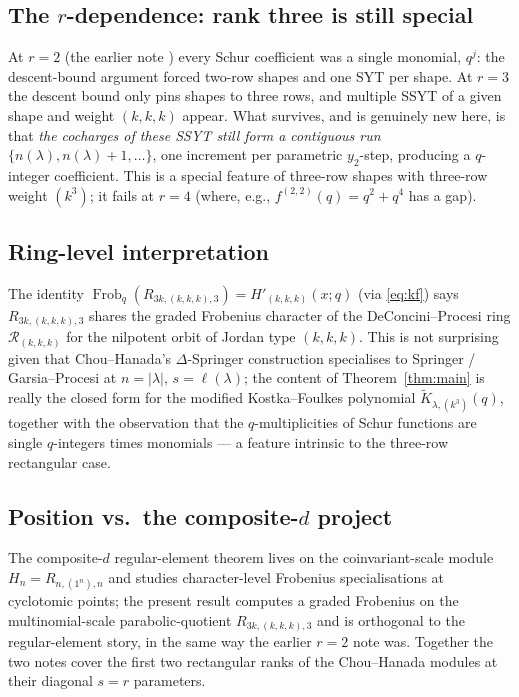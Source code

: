 \documentclass[11pt]{article}
\theoremstyle{definition}
\theoremstyle{remark}
\DeclareMathOperator{\Frob}{Frob}
\begin{document}
\subsection*{The $r$-dependence: rank three is still special}

At $r = 2$ (the earlier note \cite{clio-r2}) every Schur coefficient was a
single monomial, $q^j$: the descent-bound argument forced two-row shapes
and one SYT per shape. At $r = 3$ the descent bound only pins shapes to
three rows, and multiple SSYT of a given shape and weight $(k,k,k)$
appear. What survives, and is genuinely new here, is that
\emph{the cocharges of these SSYT still form a contiguous run}
$\{n(\lambda), n(\lambda)+1, \ldots\}$, one increment per parametric
$y_2$-step, producing a $q$-integer coefficient. This is a special feature
of three-row shapes with three-row weight $(k^3)$; it fails at $r = 4$
(where, e.g., $f^{(2,2)}(q) = q^2 + q^4$ has a gap).

\subsection*{Ring-level interpretation}

The identity $\Frob_q(R_{3k,(k,k,k),3}) = H'_{(k,k,k)}(x;q)$ (via
\eqref{eq:kf}) says $R_{3k,(k,k,k),3}$ shares the graded Frobenius
character of the DeConcini--Procesi ring $\mathcal R_{(k,k,k)}$ for the
nilpotent orbit of Jordan type $(k,k,k)$. This is not surprising given that
Chou--Hanada's $\Delta$-Springer construction specialises to Springer /
Garsia--Procesi at $n = |\lambda|,\, s = \ell(\lambda)$; the content of
Theorem~\ref{thm:main} is really the closed form for the modified
Kostka--Foulkes polynomial $\widetilde K_{\lambda,(k^3)}(q)$, together with
the observation that the $q$-multiplicities of Schur functions are single
$q$-integers times monomials --- a feature intrinsic to the three-row
rectangular case.

\subsection*{Position vs.\ the composite-$d$ project}

The composite-$d$ regular-element theorem lives on the coinvariant-scale
module $H_n = R_{n,(1^n),n}$ and studies character-level Frobenius
specialisations at cyclotomic points; the present result computes a
graded Frobenius on the multinomial-scale parabolic-quotient
$R_{3k,(k,k,k),3}$ and is orthogonal to the regular-element story, in
the same way the earlier $r=2$ note was. Together the two notes cover the
first two rectangular ranks of the Chou--Hanada modules at their diagonal
$s = r$ parameters.
\end{document}
